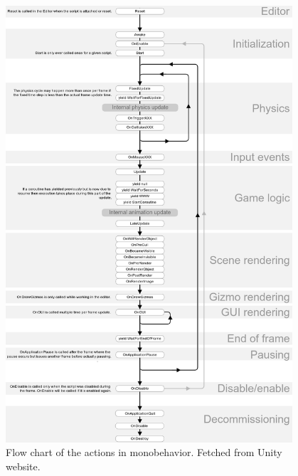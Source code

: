 \newpage
\begin{figure}[H]
    \centering
    \includegraphics[width=0.95\textwidth]{03_Background/Appendix/Images/monobehaviour_flowchart.png}
    \caption{Flow chart of the actions in monobehavior. Fetched from Unity website.}
\end{figure}